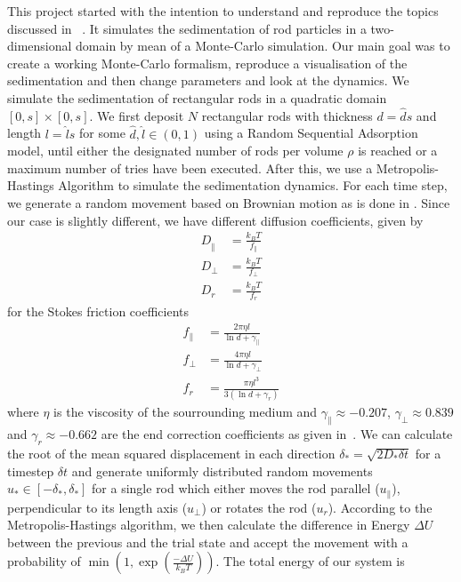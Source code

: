 This project started with the intention to understand and reproduce the topics discussed in ~\cite{SED}. It simulates the sedimentation of rod particles in a two-dimensional domain by mean of a Monte-Carlo simulation. Our main goal was to create a working Monte-Carlo formalism, reproduce a visualisation of the sedimentation and then change parameters and look at the dynamics.
We simulate the sedimentation of rectangular rods in a quadratic domain $[0,s]×[0,s]$. We first deposit $N$ rectangular rods with thickness $d = \hat ds$ and length $l = \hat ls$ for some $\hat d,\hat l∈(0,1)$ using a Random Sequential Adsorption model, until either the designated number of rods per volume $ρ$ is reached or a maximum number of tries have been executed. After this, we use a Metropolis-Hastings Algorithm to simulate the sedimentation dynamics. For each time step, we generate a random movement based on Brownian motion as is done in \cite{BD}. Since our {\color{red} case} is slightly different, we have different diffusion coefficients, given by
\begin{equation}
  \begin{array}{RLL}
    D_‖ &= \frac{k_BT}{f_\|}\\
    D_\perp &= \frac{k_BT}{f_\perp}\\
    D_r &= \frac{k_BT}{f_r}
  \end{array}
\end{equation}
for the Stokes friction coefficients
\begin{equation}
  \begin{array}{RLL}
    f_\| &= \frac{2πηl}{\ln d + γ_\|}\\
    f_\perp &= \frac{4πηl}{\ln d + γ_\perp}\\
    f_r &= \frac{πηl^3}{3(\ln d+γ_r)}
  \end{array}
\end{equation}
where $η$ is the viscosity of the sourrounding medium and $γ_\| \approx -0.207$, $γ_\perp\approx0.839$ and $γ_r\approx-0.662$ are the end correction coefficients as given in~\cite{SED}.
We can calculate the root of the mean squared displacement in each direction $δ_* = \sqrt{2D_*δt}$ for a timestep $δt$ and generate uniformly distributed random movements $u_*∈[-δ_*,δ_*]$ for a single rod which either moves the rod parallel ($u_\|$), perpendicular to its length axis ($u_\perp$) or rotates the rod ($u_r$). According to the Metropolis-Hastings algorithm, we then calculate the difference in Energy $ΔU$ between the previous and the trial state and accept the movement with a probability of $\min(1,\exp(\frac{-ΔU}{k_BT}))$. The total energy of our system is
